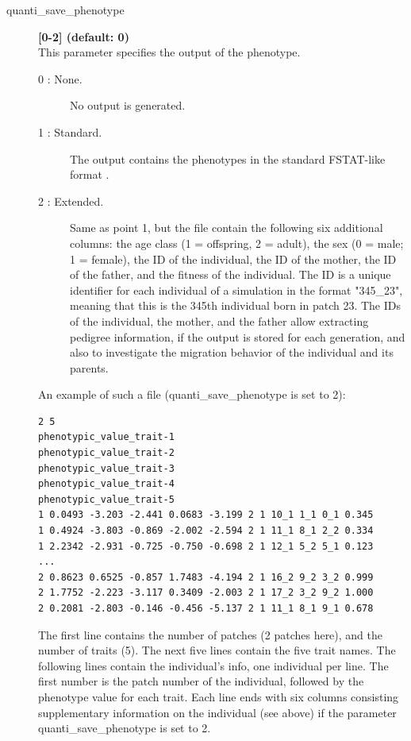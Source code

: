 \documentclass[letterpaper,12pt,oneside]{book}
\begin{document}
\begin{description} 
\item[quanti\_save\_phenotype] \textbf{[0-2] (default: 0)} \\
This parameter specifies the output of the phenotype.
\begin{description}
\item [0 : None.] No output is generated.
\item [1 : Standard.] The output contains the phenotypes in the standard FSTAT-like format \citep{Goudet_1995}. 
\item [2 : Extended.] Same as point 1, but the file contain the following six additional columns: the age class (1 = offspring, 2 = adult), the sex (0 = male; 1 = female), the ID of the individual, the ID of the mother, the ID of the father, and the fitness of the individual. The ID is a unique identifier for each individual of a simulation in the format "345\_23", meaning that this is the 345th individual born in patch 23. The IDs of the individual, the mother, and the father allow extracting pedigree information, if the output is stored for each generation, and also to investigate the migration behavior of the individual and its parents. 
\end{description} 

An example of such a file (\textsf{quanti\_save\_phenotype} is set to 2):
\begin{lstlisting}[frame=single]
2 5
phenotypic_value_trait-1
phenotypic_value_trait-2
phenotypic_value_trait-3
phenotypic_value_trait-4
phenotypic_value_trait-5
1 0.0493 -3.203 -2.441 0.0683 -3.199 2 1 10_1 1_1 0_1 0.345
1 0.4924 -3.803 -0.869 -2.002 -2.594 2 1 11_1 8_1 2_2 0.334
1 2.2342 -2.931 -0.725 -0.750 -0.698 2 1 12_1 5_2 5_1 0.123
...
2 0.8623 0.6525 -0.857 1.7483 -4.194 2 1 16_2 9_2 3_2 0.999
2 1.7752 -2.223 -3.117 0.3409 -2.003 2 1 17_2 3_2 9_2 1.000
2 0.2081 -2.803 -0.146 -0.456 -5.137 2 1 11_1 8_1 9_1 0.678
\end{lstlisting}

The first line contains the number of patches (2 patches here), and the number of traits (5). The next five lines contain the five trait names. The following lines contain the individual's info, one individual per line. The first number is the patch number of the individual, followed by the phenotype value for each trait. Each line ends with six columns consisting supplementary information on the individual (see above) if the parameter \textsf{quanti\_save\_phenotype} is set to 2.


\end{description}
\end{document}
